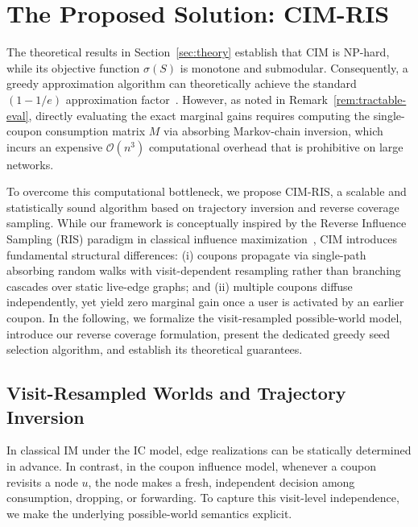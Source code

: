 \documentclass[sigconf]{acmart}
\newcommand{\CIMRIS}{\textsc{CIM-RIS}}
\begin{document}



\section{The Proposed Solution: \CIMRIS{}}
\label{sec:algo}

The theoretical results in Section~\ref{sec:theory} establish that CIM is
NP-hard, while its objective function $\sigma(S)$ is monotone and submodular.
Consequently, a greedy approximation algorithm can theoretically achieve the
standard $(1-1/e)$ approximation factor~\cite{nemhauser1978analysis}.
However, as noted in Remark~\ref{rem:tractable-eval}, directly evaluating the
exact marginal gains requires computing the single-coupon consumption
matrix $M$ via absorbing Markov-chain inversion, which incurs an expensive
$\mathcal{O}(n^3)$ computational overhead that is prohibitive on large networks.

To overcome this computational bottleneck, we propose \CIMRIS{}, a scalable
and statistically sound algorithm based on trajectory inversion and reverse
coverage sampling.
While our framework is conceptually inspired by the Reverse Influence
Sampling (RIS) paradigm in classical influence
maximization~\cite{borgs2014maximizing,tang2015influence}, CIM introduces
fundamental structural differences:
(i) coupons propagate via single-path absorbing random walks with
visit-dependent resampling rather than branching cascades over static live-edge
graphs; and
(ii) multiple coupons diffuse independently, yet yield zero marginal gain once
a user is activated by an earlier coupon.
In the following, we formalize the visit-resampled possible-world model,
introduce our reverse coverage formulation, present the dedicated greedy seed
selection algorithm, and establish its theoretical guarantees.

\subsection{Visit-Resampled Worlds and Trajectory Inversion}
\label{sec:source-worlds}

In classical IM under the IC model, edge realizations can be statically
determined in advance.
In contrast, in the coupon influence model, whenever a coupon revisits a node
$u$, the node makes a fresh, independent decision among consumption, dropping,
or forwarding.
To capture this visit-level independence, we make the underlying possible-world
semantics explicit.
\end{document}
